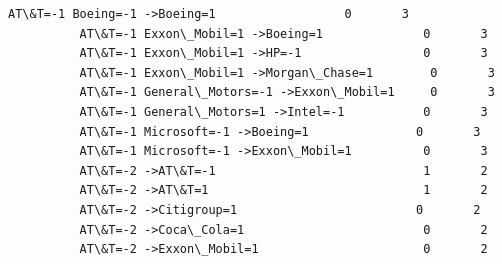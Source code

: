 \documentclass[11pt]{article}
\begin{document}
\begin{Verbatim}[commandchars=\\\{\}]
          AT\&T=-1 Boeing=-1 ->Boeing=1                  0       3  
          AT\&T=-1 Exxon\_Mobil=1 ->Boeing=1              0       3  
          AT\&T=-1 Exxon\_Mobil=1 ->HP=-1                 0       3  
          AT\&T=-1 Exxon\_Mobil=1 ->Morgan\_Chase=1        0       3  
          AT\&T=-1 General\_Motors=-1 ->Exxon\_Mobil=1     0       3  
          AT\&T=-1 General\_Motors=1 ->Intel=-1           0       3  
          AT\&T=-1 Microsoft=-1 ->Boeing=1               0       3  
          AT\&T=-1 Microsoft=-1 ->Exxon\_Mobil=1          0       3  
          AT\&T=-2 ->AT\&T=-1                             1       2  
          AT\&T=-2 ->AT\&T=1                              1       2  
          AT\&T=-2 ->Citigroup=1                         0       2  
          AT\&T=-2 ->Coca\_Cola=1                         0       2  
          AT\&T=-2 ->Exxon\_Mobil=1                       0       2  
\end{Verbatim}
            
\end{document}
